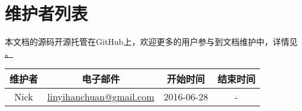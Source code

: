 {\section*{维护者列表}}

本文档的源码开源托管在GitHub上，欢迎更多的用户参与到文档维护中，详情见
\href{https://github.com/nicklinyi/IEI_zh}。

\begin{table}[H]
\centering
\begin{tabular}{cccc}
\toprule
维护者      & 电子邮件              &   开始时间    &   结束时间     \\
\midrule
Nick  & \url{linyihanchuan@gmail.com}    &  2016-06-28   &   -     \\
\bottomrule
\end{tabular}
\end{table}

